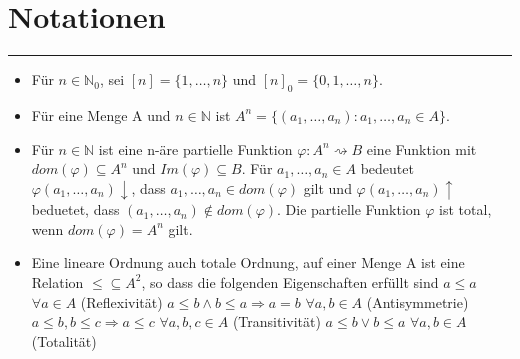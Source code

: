 \documentclass[DIV=12]{scrartcl}
\begin{document}
\section*{Notationen}
\rule{\textwidth}{0.4pt}\bigskip
\begin{itemize}
    \item Für \(n\in\mathbb{N}_0\), sei \([n]=\{1,\dots,n\}\) und \([n]_0=\{0,1,\dots,n\}\).
    \item Für eine Menge A und \(n\in\mathbb{N}\) ist \(A^n=\{(a_1,\dots,a_n):a_1,\dots,a_n\in A\}\).
    \item Für \(n\in\mathbb{N}\) ist eine n-äre partielle Funktion \(\varphi:A^n\rightsquigarrow B\) eine Funktion
    mit \(dom(\varphi)\subseteq A^n\) und \(Im(\varphi)\subseteq B\).
    Für \(a_1,\dots,a_n\in A\) bedeutet \(\varphi(a_1,\dots,a_n)\downarrow\), dass \(a_1,\dots,a_n\in dom(\varphi)\) gilt und 
    \(\varphi(a_1,\dots,a_n)\uparrow\) beduetet, dass \((a_1,\dots,a_n)\notin dom(\varphi)\).
    Die partielle Funktion \(\varphi\) ist total, wenn \(dom(\varphi)=A^n\) gilt.
    \item Eine lineare Ordnung auch totale Ordnung, auf einer Menge A ist eine Relation \(\leq\subseteq A^2\), so dass 
    die folgenden Eigenschaften erfüllt sind
        \subitem \(a\leq a\) \(\forall a\in A\) (Reflexivität)
        \subitem \(a\leq b\wedge b\leq a\Rightarrow a=b\) \(\forall a,b\in A\) (Antisymmetrie)
        \subitem \(a\leq b,b\leq c\Rightarrow a\leq c\) \(\forall a,b,c\in A\) (Transitivität)
        \subitem \(a\leq b\vee b\leq a\) \(\forall a,b\in A\) (Totalität)
\end{itemize}
\pagestyle{fancy}
\fancyhead{}





\end{document}

